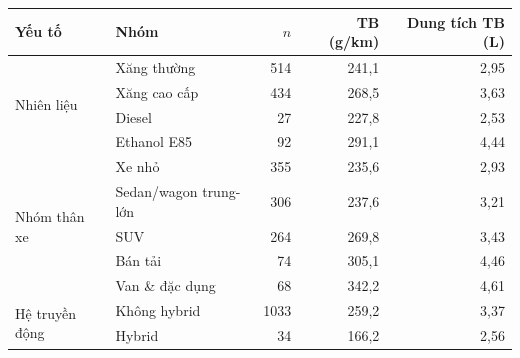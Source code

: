 \begin{tabular}{@{}l l r r r@{}}
\toprule
Yếu tố & Nhóm & $n$ & \COtwo{} TB (g/km) & Dung tích TB (L) \\
\midrule
\multirow{4}{*}{Nhiên liệu} & Xăng thường & 514 & 241,1 & 2,95 \\
 & Xăng cao cấp & 434 & 268,5 & 3,63 \\
 & Diesel & 27 & 227,8 & 2,53 \\
 & Ethanol E85 & 92 & 291,1 & 4,44 \\
\midrule
\multirow{5}{*}{Nhóm thân xe} & Xe nhỏ & 355 & 235,6 & 2,93 \\
 & Sedan/wagon trung-lớn & 306 & 237,6 & 3,21 \\
 & SUV & 264 & 269,8 & 3,43 \\
 & Bán tải & 74 & 305,1 & 4,46 \\
 & Van \& đặc dụng & 68 & 342,2 & 4,61 \\
\midrule
\multirow{2}{*}{Hệ truyền động} & Không hybrid & 1033 & 259,2 & 3,37 \\
 & Hybrid & 34 & 166,2 & 2,56 \\
\bottomrule
\end{tabular}
